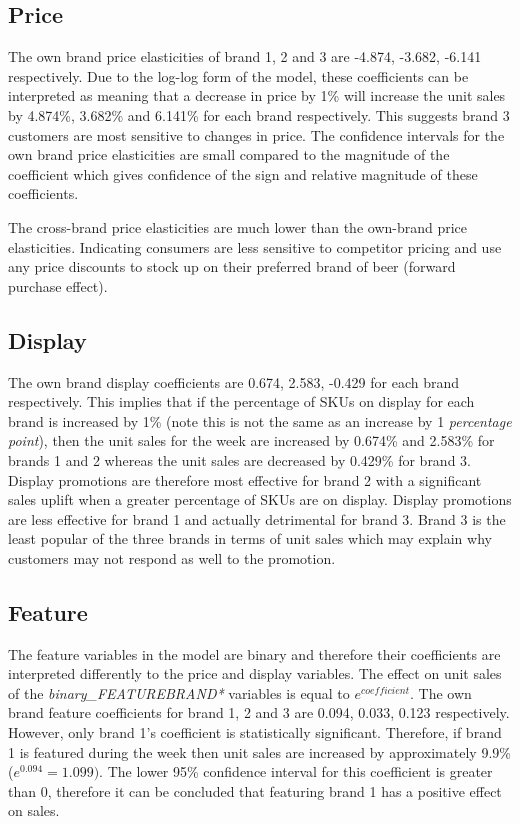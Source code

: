 \documentclass[a4paper,11pt]{article}
\begin{document}
\subsection{Price}

The own brand price elasticities of brand 1, 2 and 3 are -4.874, -3.682, -6.141 respectively. Due to the log-log form of the model, these coefficients can be interpreted as meaning that a decrease in price by 1\% will increase the unit sales by 4.874\%, 3.682\% and 6.141\% for each brand respectively. This suggests brand 3 customers are most sensitive to changes in price. The confidence intervals for the own brand price elasticities are small compared to the magnitude of the coefficient which gives confidence of the sign and relative magnitude of these coefficients.

The cross-brand price elasticities are much lower than the own-brand price elasticities. Indicating consumers are less sensitive to competitor pricing and use any price discounts to stock up on their preferred brand of beer (forward purchase effect).


\subsection{Display}

The own brand display coefficients are 0.674, 2.583, -0.429 for each brand respectively. This implies that if the percentage of SKUs on display for each brand is increased by 1\% (note this is not the same as an increase by 1 \textit{percentage point}), then the unit sales for the week are increased by 0.674\% and 2.583\% for brands 1 and 2 whereas the unit sales are decreased by 0.429\% for brand 3. Display promotions are therefore most effective for brand 2 with a significant sales uplift when a greater percentage of SKUs are on display. Display promotions are less effective for brand 1 and actually detrimental for brand 3. Brand 3 is the least popular of the three brands in terms of unit sales which may explain why customers may not respond as well to the promotion.

\subsection{Feature}

The feature variables in the model are binary and therefore their coefficients are interpreted differently to the price and display variables. The effect on unit sales of the \textit{binary\_FEATUREBRAND*} variables is equal to $e^{coefficient}$. The own brand feature coefficients for brand 1, 2 and 3 are 0.094, 0.033, 0.123 respectively. However, only brand 1's coefficient is statistically significant. Therefore, if brand 1 is featured during the week then unit sales are increased by approximately 9.9\% ($e^{0.094} = 1.099)$. The lower 95\% confidence interval for this coefficient is greater than 0, therefore it can be concluded that featuring brand 1 has a positive effect on sales.
\end{document}
